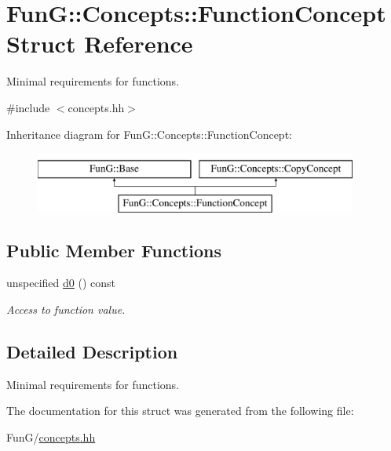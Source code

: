 \hypertarget{structFunG_1_1Concepts_1_1FunctionConcept}{\section{Fun\-G\-:\-:Concepts\-:\-:Function\-Concept Struct Reference}
\label{structFunG_1_1Concepts_1_1FunctionConcept}
}


Minimal requirements for functions.  




{\ttfamily \#include $<$concepts.\-hh$>$}

Inheritance diagram for Fun\-G\-:\-:Concepts\-:\-:Function\-Concept\-:\begin{figure}[H]
\begin{center}
\leavevmode
\includegraphics[height=2.000000cm]{structFunG_1_1Concepts_1_1FunctionConcept}
\end{center}
\end{figure}
\subsection*{Public Member Functions}
\begin{DoxyCompactItemize}
\item 
\hypertarget{structFunG_1_1Concepts_1_1FunctionConcept_a3ced15c8956956bd12c2776fc7c79771}{unspecified \hyperlink{structFunG_1_1Concepts_1_1FunctionConcept_a3ced15c8956956bd12c2776fc7c79771}{d0} () const }\label{structFunG_1_1Concepts_1_1FunctionConcept_a3ced15c8956956bd12c2776fc7c79771}

\begin{DoxyCompactList}\small\item\em Access to function value. \end{DoxyCompactList}\end{DoxyCompactItemize}


\subsection{Detailed Description}
Minimal requirements for functions. 

The documentation for this struct was generated from the following file\-:\begin{DoxyCompactItemize}
\item 
Fun\-G/\hyperlink{concepts_8hh}{concepts.\-hh}\end{DoxyCompactItemize}
